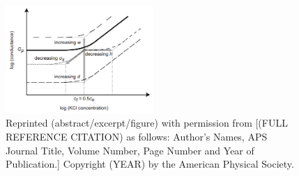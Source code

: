 			\begin{figure} 
				\includegraphics[width=0.5\textwidth]{Schoch2008_conductance}
				\caption{Reprinted (abstract/excerpt/figure) with permission from [(FULL REFERENCE CITATION) as follows: Author's Names, APS Journal Title, Volume Number, Page Number and Year of Publication.] Copyright (YEAR) by the American Physical Society.}
				\label{fig:Schoch2008conductance}
			\end{figure}
		

